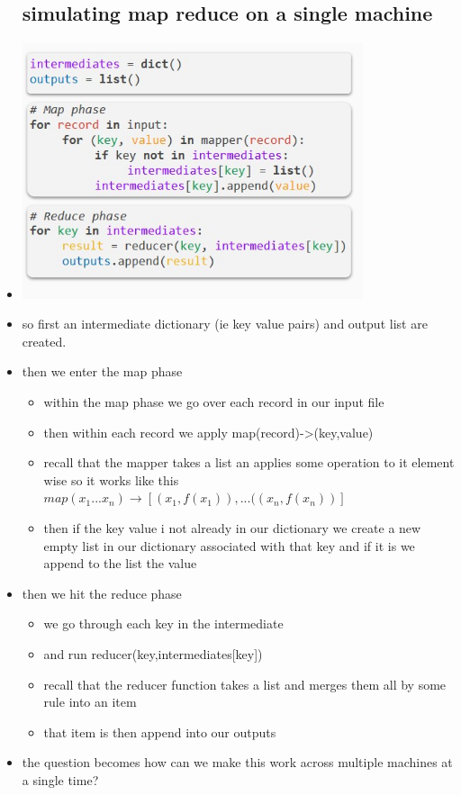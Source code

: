 \documentclass{article}
\begin{document}
\begin{itemize}
\subsection{simulating map reduce on a single machine}
\item \includegraphics[width=10cm]{lecture notes/week_4/immages/l4_1.jpg}
\item so first an intermediate dictionary (ie key value pairs) and output list are created. 
\item then we enter the map phase
\begin{itemize}
    \item within the map phase we go over each record in our input file 
    \item then within each record we apply map(record)->(key,value)
    \item recall that the mapper takes a list an applies some operation to it element wise so it works like this $map(x_1...x_n)\rightarrow [(x_1,f(x_1)),...((x_n,f(x_n)) ]$
    \item then if the key value i not already in our dictionary we create a new empty list in our dictionary associated with that key and if it is we append to the list the value
\end{itemize}
\item then we hit the reduce phase
\begin{itemize}
    \item we go through each key in the intermediate 
    \item and run reducer(key,intermediates[key])
    \item recall that the reducer function takes a list and merges them all by some rule into an item 
    \item that item is then append into our outputs 
\end{itemize}
\item the question becomes how can we make this work across multiple machines at a single time?

\end{itemize}
\end{document}

